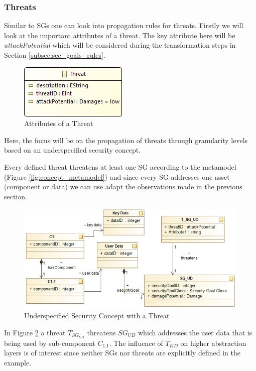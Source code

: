 \subsubsection*{Threats}

Similar to SGs one can look into propagation rules for threats. Firstly we will look at the important attributes of a threat. The key attribute here will be \textit{attackPotential} which will be considered during the transformation steps in Section \ref{subsec:sec_goals_rules}.  
 
\begin{figure}[H]
\centering
\includegraphics[scale=0.85]{pictures/threat.png}
\caption{Attributes of a Threat}
\label{fig:threat}
\end{figure} 

Here, the focus will be on the propagation of threats through granularity levels based on an underspecified security concept.

Every defined threat threatens at least one SG according to the metamodel (Figure \ref{fig:concept_metamodel}) and since every SG addresses one asset (component or data) we can use adapt the observations made in the previous section. 

\begin{figure}[H]
\centering
\includegraphics[scale=0.85]{pictures/threat_overview.png}
\caption{Underspecified Security Concept with a Threat}
\label{fig:threat_overview}
\end{figure} 

In Figure \ref{fig:threat_overview} a threat $T_{SG_{UD}}$ threatens $SG_{UD}$ which addresses the user data that is being used by sub-component $C_{1.1}$. The influence of $T_{KD}$ on higher abstraction layers is of interest since neither SGs nor threats are explicitly defined in the example.


